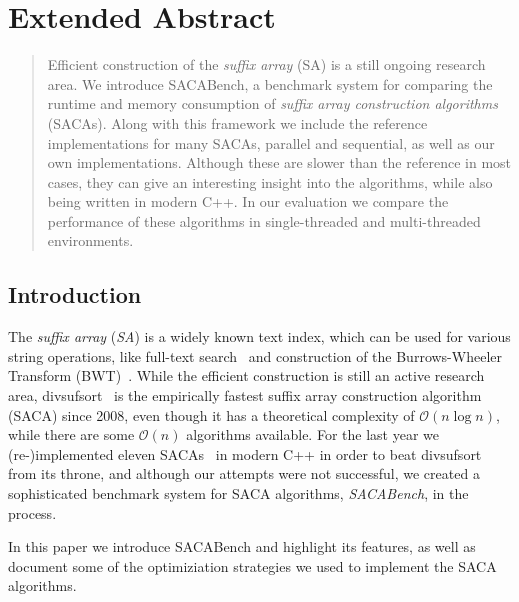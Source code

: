 \chapter{Extended Abstract}


{
\newtheorem*{abstract}{Abstract}

\begin{abstract}
    Efficient construction of the \emph{suffix array} (SA) is a still ongoing research area.
    We introduce SACABench, a benchmark system for comparing the runtime and memory consumption of \emph{suffix array construction algorithms} (SACAs).
    Along with this framework we include the reference implementations for many SACAs, parallel and sequential, as well as our own implementations.
    Although these are slower than the reference in most cases, they can give an interesting insight into the algorithms, while also being written in modern C++.
    In our evaluation we compare the performance of these algorithms in single-threaded and multi-threaded environments.
\end{abstract}
}

\section{Introduction}

The  \emph{suffix array} (\emph{SA}) is a widely known text index,
which can be used for various string operations,
like full-text search~\cite{makinen} and construction of the Burrows-Wheeler Transform (BWT)~\cite{BWT}.
While the efficient construction is still an active research area,
divsufsort~\cite{saca:5,saca:5:repo} is the empirically fastest suffix array construction algorithm (SACA) since 2008,
even though it has a theoretical complexity of $\mathcal O (n \log n)$,
while there are some $\mathcal O(n)$ algorithms available.
For the last year we (re-)implemented eleven SACAs~\cite{saca:3,saca:11,saca:5,saca:9,saca:1,saca:8,saca:4,saca:7,saca:10,saca:6,saca:2} in modern C++ in order to beat divsufsort from its throne,
and although our attempts were not successful,
we created a sophisticated benchmark system for SACA algorithms, \emph{SACABench}, in the process.

In this paper we introduce SACABench and highlight its features,
as well as document some of the optimiziation strategies we used to implement the SACA algorithms. \blindtext

